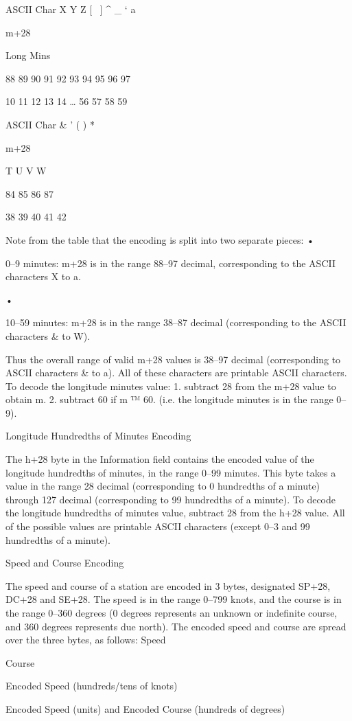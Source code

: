 {{{{ASCII
Char
X
Y
Z
[
\
]
^
_
‘
a

m+28

Long
Mins

88
89
90
91
92
93
94
95
96
97

10
11
12
13
14
…
56
57
58
59

ASCII
Char
&
'
(
)
*

m+28

T
U
V
W

84
85
86
87

38
39
40
41
42

Note from the table that the encoding is split into two separate pieces:
•

0–9 minutes: m+28 is in the range 88–97 decimal, corresponding to
the ASCII characters X to a.

•

10–59 minutes: m+28 is in the range 38–87 decimal (corresponding
to the ASCII characters & to W).

Thus the overall range of valid m+28 values is 38–97 decimal (corresponding
to ASCII characters & to a). All of these characters are printable ASCII
characters.
To decode the longitude minutes value:
1. subtract 28 from the m+28 value to obtain m.
2. subtract 60 if m ™ 60.
(i.e. the longitude minutes is in the range 0–9).

Longitude
Hundredths of
Minutes Encoding

The h+28 byte in the Information field contains the encoded value of the
longitude hundredths of minutes, in the range 0–99 minutes. This byte takes
a value in the range 28 decimal (corresponding to 0 hundredths of a minute)
through 127 decimal (corresponding to 99 hundredths of a minute).
To decode the longitude hundredths of minutes value, subtract 28 from the
h+28 value.
All of the possible values are printable ASCII characters (except 0–3 and 99
hundredths of a minute).

Speed and Course
Encoding

The speed and course of a station are encoded in 3 bytes, designated SP+28,
DC+28 and SE+28.
The speed is in the range 0–799 knots, and the course is in the range 0–360
degrees (0 degrees represents an unknown or indefinite course, and 360
degrees represents due north).
The encoded speed and course are spread over the three bytes, as follows:
Speed

Course

Encoded Speed
(hundreds/tens of knots)

Encoded Speed (units) and
Encoded Course
(hundreds of degrees)

}}}}
